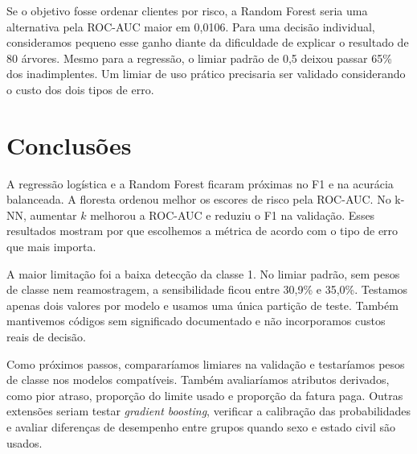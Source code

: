 \documentclass[11pt,a4paper]{article}
\begin{document}
Se o objetivo fosse ordenar clientes por risco, a Random Forest seria
uma alternativa pela ROC-AUC maior em 0,0106. Para uma decisão
individual, consideramos pequeno esse ganho diante da dificuldade
de explicar o resultado de 80 árvores. Mesmo para a regressão, o
limiar padrão de 0,5 deixou passar 65\% dos inadimplentes. Um limiar de
uso prático precisaria ser validado considerando o custo dos dois
tipos de erro.

\newpage
\section{Conclusões}
A regressão logística e a Random Forest ficaram próximas no F1 e na
acurácia balanceada. A floresta ordenou melhor os escores de risco
pela ROC-AUC. No k-NN, aumentar $k$ melhorou a ROC-AUC e reduziu o F1
na validação. Esses resultados mostram por que escolhemos a métrica de
acordo com o tipo de erro que mais importa.

A maior limitação foi a baixa detecção da classe 1. No limiar padrão,
sem pesos de classe nem reamostragem, a sensibilidade ficou entre
30,9\% e 35,0\%. Testamos apenas dois valores por modelo e usamos uma
única partição de teste. Também mantivemos códigos sem significado
documentado e não incorporamos custos reais de decisão.

Como próximos passos, compararíamos limiares na validação e testaríamos
pesos de classe nos modelos compatíveis. Também avaliaríamos atributos
derivados, como pior atraso, proporção do limite usado e proporção da
fatura paga. Outras extensões seriam testar \textit{gradient boosting},
verificar a calibração das probabilidades e avaliar diferenças de
desempenho entre grupos quando sexo e estado civil são usados.
\end{document}
